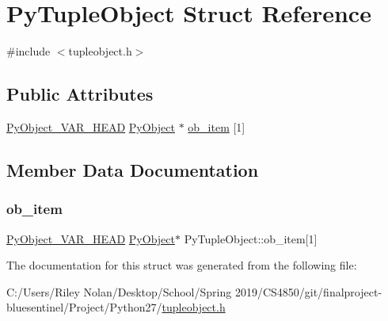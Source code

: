 \hypertarget{struct_py_tuple_object}{}\section{Py\+Tuple\+Object Struct Reference}
\label{struct_py_tuple_object}


{\ttfamily \#include $<$tupleobject.\+h$>$}

\subsection*{Public Attributes}
\begin{DoxyCompactItemize}
\item 
\mbox{\hyperlink{_python27_2object_8h_aa0eba161a76be8710b3de325c2e7f9e2}{Py\+Object\+\_\+\+V\+A\+R\+\_\+\+H\+E\+AD}} \mbox{\hyperlink{_python27_2object_8h_aadc84ac7aed2cfa6f20c25f62bf3dac7}{Py\+Object}} $\ast$ \mbox{\hyperlink{struct_py_tuple_object_ab28040a8b2ac21163a7df75596c1c431}{ob\+\_\+item}} \mbox{[}1\mbox{]}
\end{DoxyCompactItemize}


\subsection{Member Data Documentation}
\mbox{\label{struct_py_tuple_object_ab28040a8b2ac21163a7df75596c1c431}} 
\subsubsection{\texorpdfstring{ob\_item}{ob\_item}}
{\footnotesize\ttfamily \mbox{\hyperlink{_python27_2object_8h_aa0eba161a76be8710b3de325c2e7f9e2}{Py\+Object\+\_\+\+V\+A\+R\+\_\+\+H\+E\+AD}} \mbox{\hyperlink{_python27_2object_8h_aadc84ac7aed2cfa6f20c25f62bf3dac7}{Py\+Object}}$\ast$ Py\+Tuple\+Object\+::ob\+\_\+item\mbox{[}1\mbox{]}}



The documentation for this struct was generated from the following file\+:\begin{DoxyCompactItemize}
\item 
C\+:/\+Users/\+Riley Nolan/\+Desktop/\+School/\+Spring 2019/\+C\+S4850/git/finalproject-\/bluesentinel/\+Project/\+Python27/\mbox{\hyperlink{tupleobject_8h}{tupleobject.\+h}}\end{DoxyCompactItemize}

